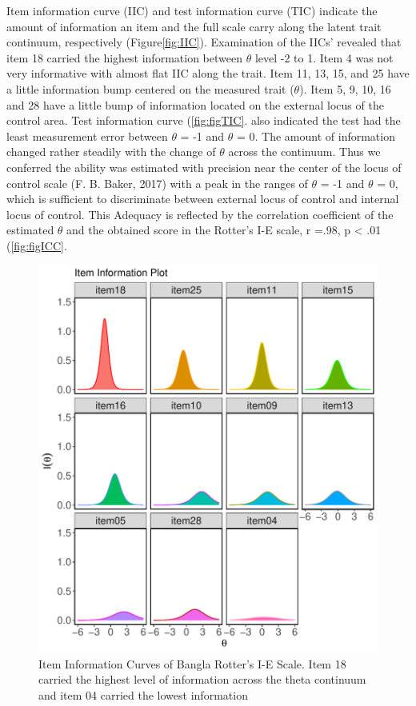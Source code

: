 \documentclass[
  man]{apa6}
\begin{document}
Item information curve (IIC) and test information curve (TIC) indicate the amount of information an item and the full scale carry along the latent trait continuum, respectively (Figure\ref{fig:IIC}). Examination of the IICs' revealed that item 18 carried the highest information between \(\theta\) level -2 to 1. Item 4 was not very informative with almost flat IIC along the trait. Item 11, 13, 15, and 25 have a little information bump centered on the measured trait (\(\theta\)). Item 5, 9, 10, 16 and 28 have a little bump of information located on the external locus of the control area. Test information curve (\ref{fig:figTIC}. also indicated the test had the least measurement error between \(\theta\) = -1 and \(\theta\) = 0. The amount of information changed rather steadily with the change of \(\theta\) across the continuum. Thus we conferred the ability was estimated with precision near the center of the locus of control scale (F. B. Baker, 2017) with a peak in the ranges of \(\theta\) = -1 and \(\theta\) = 0, which is sufficient to discriminate between external locus of control and internal locus of control. This Adequacy is reflected by the correlation coefficient of the estimated \(\theta\) and the obtained score in the Rotter's I-E scale, r =.98, p \textless{} .01 (\ref{fig:figICC}.

\begin{figure}
\includegraphics[width=7in]{Figures/600/ifc} \caption{Item Information Curves of Bangla Rotter’s I-E Scale. Item 18 carried the highest level of information across the theta continuum and item 04 carried the lowest information}\label{fig:FigTIC}
\end{figure}
\end{document}
